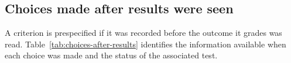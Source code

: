 \clearpage
\subsection{Choices made after results were seen}
\label{app:choices-after-results}
\label{app:devhistory}
\label{app:devhistory-systematics}
\label{app:devhistory-2dchecks}
\label{app:devhistory-validation}
\label{app:devhistory-band}
\label{app:devhistory-3d}
\label{app:devhistory-fived16}
\label{app:devhistory-fived16pl}
\label{app:devhistory-fived16cov}
\label{app:devhistory-fived16-stageg}
\label{app:devhistory-joint}
\label{app:devhistory-lost}

A criterion is prespecified if it was recorded before the outcome it grades was read. Table~\ref{tab:choices-after-results} identifies the information available when each choice was made and the status of the associated test.

